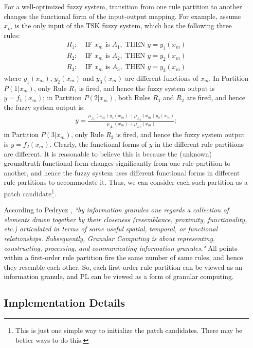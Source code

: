 \documentclass[journal,twocolumn]{IEEEtran}
\begin{document}
For a well-optimized fuzzy system, transition from one rule partition to another changes the functional form of the input-output mapping. For example,  assume $x_m$ is the only input of the TSK fuzzy system, which has the following three rules:
\begin{align*}
R_1: &\mbox{ IF } x_m \mbox{ is } A_1, \mbox{ THEN } y=y_1(x_m)\\
R_2: &\mbox{ IF } x_m \mbox{ is } A_2, \mbox{ THEN } y=y_2(x_m)\\
R_3: &\mbox{ IF } x_m \mbox{ is } A_3, \mbox{ THEN } y=y_3(x_m)
\end{align*}
where $y_1(x_m)$, $y_2(x_m)$ and $y_3(x_m)$ are different functions of $x_m$. In Partition $P(1|x_m)$, only Rule $R_1$ is fired, and hence the fuzzy system output is $y=f_1(x_m)$; in Partition $P(2|x_m)$, both Rules $R_1$ and $R_2$ are fired, and hence the fuzzy system output is:
\begin{align}
y=\frac{\mu_{A_1}(x_m)y_1(x_m)+\mu_{A_2}(x_m)y_2(x_m)}{\mu_{A_1}(x_m)+\mu_{A_2}(x_m)};
\end{align}
in Partition $P(3|x_m)$, only Rule $R_2$ is fired, and hence the fuzzy system output is $y=f_2(x_m)$. Clearly, the functional forms of $y$ in the different rule partitions are different. It is reasonable to believe this is because the (unknown) groundtruth functional form changes significantly from one rule partition to another, and hence the fuzzy system uses different functional forms in different rule partitions to accommodate it. Thus, we can consider each such partition as a patch candidate\footnote{This is just one simple way to initialize the patch candidates. There may be better ways to do this.}.

According to Pedrycz \cite{Pedrycz2018}, \emph{``by information granules one regards a collection of elements drawn together by their closeness (resemblance, proximity, functionality, etc.) articulated in terms of some useful spatial, temporal, or functional relationships. Subsequently, Granular Computing is about representing, constructing, processing, and communicating information granules."} All points within a first-order rule partition fire the same number of same rules, and hence they resemble each other. So, each first-order rule partition can be viewed as an information granule, and PL can be viewed as a form of granular computing.

\subsection{Implementation Details}
\end{document}
